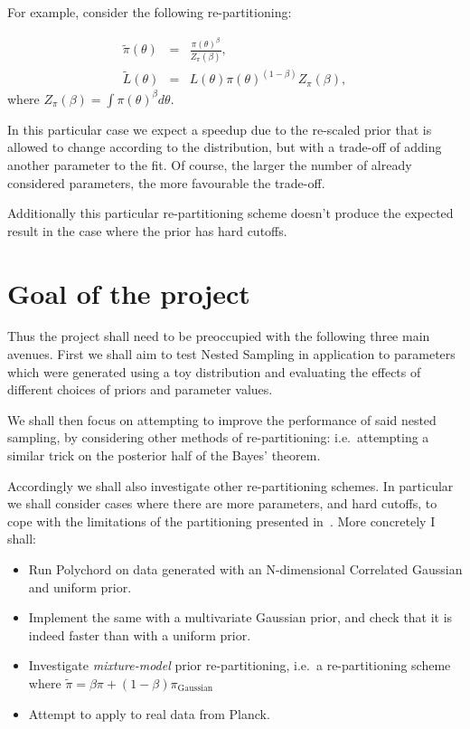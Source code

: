 \documentclass[11pt, reprint]{revtex4-2}
\begin{document}
For example\cite{chen-ferroz-hobson}, consider the following re-partitioning:

\begin{eqnarray} 
\tilde{\pi} (\theta) &=& \frac{\pi {(\theta)}^\beta }{Z_\pi (\beta)},\\
\tilde{L} (\theta) &=&L(\theta) \pi {(\theta)}^{(1-\beta)} Z_\pi(\beta) ,
\end{eqnarray}
where $Z_{\pi}(\beta) = \int \pi {(\theta)}^{\beta} d\theta$. 

In this particular case we expect a speedup due to the re-scaled prior
that is allowed to change according to the distribution, but with a
trade-off of adding another parameter to the fit. Of course, the
larger the number of already considered parameters, the more
favourable the trade-off.

Additionally this particular re-partitioning scheme doesn't produce
the expected result in the case where the prior has hard cutoffs.
\goodbreak%
\section{Goal of the project}\label{sec-5}

Thus the project shall need to be preoccupied with the following three
main avenues. First we shall aim to test Nested Sampling in
application to parameters which were generated using a toy
distribution and evaluating the effects of different choices of priors
and parameter values.

We shall then focus on attempting to improve the performance of said
nested sampling, by considering other methods of re-partitioning:
i.e.~attempting a similar trick on the posterior half of the Bayes'
theorem.

Accordingly we shall also investigate other re-partitioning
schemes. In particular we shall consider cases where there are more
parameters, and hard cutoffs, to cope with the limitations of the
partitioning presented in~\cite{chen-ferroz-hobson}.
\goodbreak%
More concretely I shall: 
\begin{itemize}
\item Run Polychord on data generated with an N-dimensional Correlated
  Gaussian and uniform prior.
\item Implement the same with a multivariate Gaussian prior, and check
  that it is indeed faster than with a uniform prior.
\item Investigate \emph{mixture-model} prior re-partitioning, i.e.~a
  re-partitioning scheme where
  \( \tilde{\pi} = \beta \pi + (1 - \beta ) \pi_\text{Gaussian}\)
  
\item Attempt to apply to real data from Planck\cite{planck}.
\end{itemize}
\end{document}
